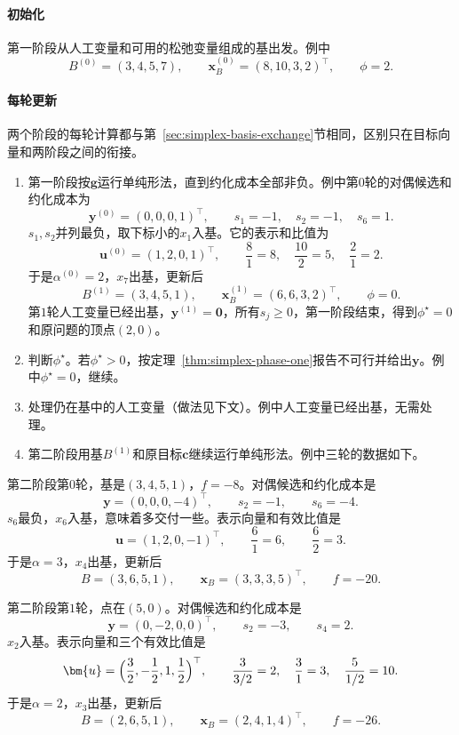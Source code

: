 \paragraph{初始化}
第一阶段从人工变量和可用的松弛变量组成的基出发。例中
\[
 B^{(0)}=(3,4,5,7),\qquad \bm{x}_B^{(0)}=(8,10,3,2)^\top,\qquad \phi=2.
\]

\paragraph{每轮更新}
两个阶段的每轮计算都与第~\ref{sec:simplex-basis-exchange}节相同，区别只在目标向量和两阶段之间的衔接。
\begin{enumerate}
 \item 第一阶段按$\bm{g}$运行单纯形法，直到约化成本全部非负。例中第$0$轮的对偶候选和约化成本为
 \[
  \bm{y}^{(0)}=(0,0,0,1)^\top,\qquad s_1=-1,\quad s_2=-1,\quad s_6=1.
 \]
 $s_1,s_2$并列最负，取下标小的$x_1$入基。它的表示和比值为
 \[
  \bm{u}^{(0)}=(1,2,0,1)^\top,\qquad
  \frac{8}{1}=8,\quad \frac{10}{2}=5,\quad \frac{2}{1}=2.
 \]
 于是$\alpha^{(0)}=2$，$x_7$出基，更新后
 \[
  B^{(1)}=(3,4,5,1),\qquad \bm{x}_B^{(1)}=(6,6,3,2)^\top,\qquad\phi=0.
 \]
 第$1$轮人工变量已经出基，$\bm{y}^{(1)}=\bm{0}$，所有$s_j\geq0$，第一阶段结束，得到$\phi^\star=0$和原问题的顶点$(2,0)$。
 \item 判断$\phi^\star$。若$\phi^\star>0$，按定理~\ref{thm:simplex-phase-one}报告不可行并给出$\bm{y}$。例中$\phi^\star=0$，继续。
 \item 处理仍在基中的人工变量（做法见下文）。例中人工变量已经出基，无需处理。
 \item 第二阶段用基$B^{(1)}$和原目标$\bm{c}$继续运行单纯形法。例中三轮的数据如下。
\end{enumerate}

第二阶段第$0$轮，基是$(3,4,5,1)$，$f=-8$。对偶候选和约化成本是
\[
 \bm{y}=(0,0,0,-4)^\top,\qquad s_2=-1,\qquad s_6=-4.
\]
$s_6$最负，$x_6$入基，意味着多交付一些。表示向量和有效比值是
\[
 \bm{u}=(1,2,0,-1)^\top,\qquad \frac{6}{1}=6,\qquad \frac{6}{2}=3.
\]
于是$\alpha=3$，$x_4$出基，更新后
\[
 B=(3,6,5,1),\qquad \bm{x}_B=(3,3,3,5)^\top,\qquad f=-20.
\]

第二阶段第$1$轮，点在$(5,0)$。对偶候选和约化成本是
\[
 \bm{y}=(0,-2,0,0)^\top,\qquad s_2=-3,\qquad s_4=2.
\]
$x_2$入基。表示向量和三个有效比值是
\[
 \bm{u}=\Bigl(\frac32,-\frac12,1,\frac12\Bigr)^\top,\qquad
 \frac{3}{3/2}=2,\quad \frac{3}{1}=3,\quad \frac{5}{1/2}=10.
\]
于是$\alpha=2$，$x_3$出基，更新后
\[
 B=(2,6,5,1),\qquad \bm{x}_B=(2,4,1,4)^\top,\qquad f=-26.
\]

